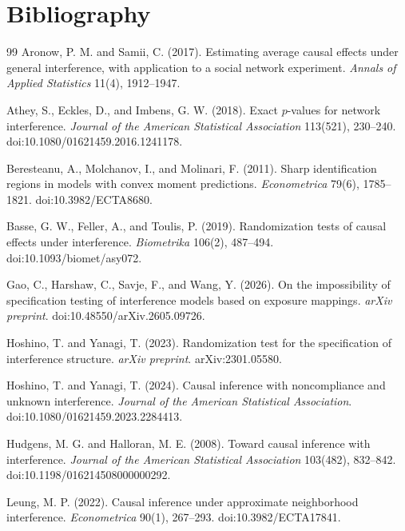 \documentclass[11pt]{article}
\theoremstyle{definition}
\theoremstyle{plain}
\theoremstyle{remark}
\begin{document}
\section*{Bibliography}
\begin{thebibliography}{99}
Aronow, P. M. and Samii, C. (2017).
Estimating average causal effects under general interference, with application to a social network experiment.
\emph{Annals of Applied Statistics} 11(4), 1912--1947.

Athey, S., Eckles, D., and Imbens, G. W. (2018).
Exact \(p\)-values for network interference.
\emph{Journal of the American Statistical Association} 113(521), 230--240.
doi:10.1080/01621459.2016.1241178.

Beresteanu, A., Molchanov, I., and Molinari, F. (2011).
Sharp identification regions in models with convex moment predictions.
\emph{Econometrica} 79(6), 1785--1821.
doi:10.3982/ECTA8680.

Basse, G. W., Feller, A., and Toulis, P. (2019).
Randomization tests of causal effects under interference.
\emph{Biometrika} 106(2), 487--494.
doi:10.1093/biomet/asy072.

Gao, C., Harshaw, C., Savje, F., and Wang, Y. (2026).
On the impossibility of specification testing of interference models based on exposure mappings.
\emph{arXiv preprint}.
doi:10.48550/arXiv.2605.09726.

Hoshino, T. and Yanagi, T. (2023).
Randomization test for the specification of interference structure.
\emph{arXiv preprint}.
arXiv:2301.05580.

Hoshino, T. and Yanagi, T. (2024).
Causal inference with noncompliance and unknown interference.
\emph{Journal of the American Statistical Association}.
doi:10.1080/01621459.2023.2284413.

Hudgens, M. G. and Halloran, M. E. (2008).
Toward causal inference with interference.
\emph{Journal of the American Statistical Association} 103(482), 832--842.
doi:10.1198/016214508000000292.

Leung, M. P. (2022).
Causal inference under approximate neighborhood interference.
\emph{Econometrica} 90(1), 267--293.
doi:10.3982/ECTA17841.


\end{thebibliography}
\end{document}
